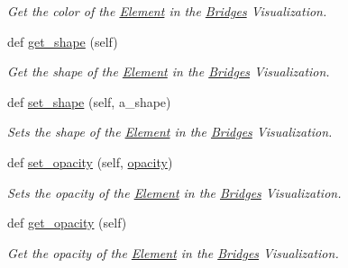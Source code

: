 \begin{DoxyCompactItemize}
\begin{DoxyCompactList}\small\item\em Get the color of the \mbox{\hyperlink{namespace_bridges_1_1_element}{Element}} in the \mbox{\hyperlink{namespace_bridges_1_1_bridges}{Bridges}} Visualization. \end{DoxyCompactList}\item 
def \mbox{\hyperlink{class_bridges_1_1_element_visualizer_1_1_element_visualizer_aa1fe7978af156f5a2a2cad15eda02287}{get\+\_\+shape}} (self)
\begin{DoxyCompactList}\small\item\em Get the shape of the \mbox{\hyperlink{namespace_bridges_1_1_element}{Element}} in the \mbox{\hyperlink{namespace_bridges_1_1_bridges}{Bridges}} Visualization. \end{DoxyCompactList}\item 
def \mbox{\hyperlink{class_bridges_1_1_element_visualizer_1_1_element_visualizer_a82348f58c951b0608ec4fb04eaa3e097}{set\+\_\+shape}} (self, a\+\_\+shape)
\begin{DoxyCompactList}\small\item\em Sets the shape of the \mbox{\hyperlink{namespace_bridges_1_1_element}{Element}} in the \mbox{\hyperlink{namespace_bridges_1_1_bridges}{Bridges}} Visualization. \end{DoxyCompactList}\item 
def \mbox{\hyperlink{class_bridges_1_1_element_visualizer_1_1_element_visualizer_a35f9781eaadd9ce1149cfbc8475a3c51}{set\+\_\+opacity}} (self, \mbox{\hyperlink{class_bridges_1_1_element_visualizer_1_1_element_visualizer_ab26841a89ad63bac0828c15b01ec92b2}{opacity}})
\begin{DoxyCompactList}\small\item\em Sets the opacity of the \mbox{\hyperlink{namespace_bridges_1_1_element}{Element}} in the \mbox{\hyperlink{namespace_bridges_1_1_bridges}{Bridges}} Visualization. \end{DoxyCompactList}\item 
def \mbox{\hyperlink{class_bridges_1_1_element_visualizer_1_1_element_visualizer_a54a58179a82e3d571069f2918114ce9e}{get\+\_\+opacity}} (self)
\begin{DoxyCompactList}\small\item\em Get the opacity of the \mbox{\hyperlink{namespace_bridges_1_1_element}{Element}} in the \mbox{\hyperlink{namespace_bridges_1_1_bridges}{Bridges}} Visualization. \end{DoxyCompactList}\item 

\end{DoxyCompactItemize}
